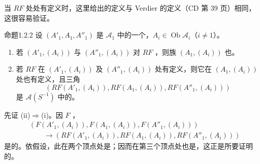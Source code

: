 当 $RF$ 处处有定义时，这里给出的定义与 Verdier 的定义（CD 第 39 页）相同，这很容易验证。

\begin{SGAresult}{命题}{1.2.2}
设 $(A'_1,A_1,A''_1)$ 是 $\mathcal A_1$ 中的一个，$A_i\in\operatorname{Ob}\mathcal A_i$（$i\ne1$）。
\begin{enumerate}
\item[(i)] 若 $(A'_1,(A_i))$ 与 $(A''_1,(A_i))$ 对 $RF$ ，则族 $(A_1,(A_i))$ 也。
\item[(ii)] 若 $RF$ 在 $(A'_1,(A_i))$ 及 $(A''_1,(A_i))$ 处有定义，则它在 $(A_1,(A_i))$ 处也有定义，且三角
\[
(RF(A'_1,(A_i)),RF(A_1,(A_i)),RF(A''_1,(A_i)))
\]
是 $\mathcal A(S^{-1})$ 中的。
\end{enumerate}
\end{SGAresult}
先证 (ii)$\Rightarrow$(i)。因 $F$ ，
\[
\begin{aligned}
{}&(F(A'_1,(A_i)),F(A_1,(A_i)),F(A''_1,(A_i)))\\
&\qquad\longrightarrow(RF(A'_1,(A_i)),RF(A_1,(A_i)),RF(A''_1,(A_i)))
\end{aligned}
\]
是的。依假设，此在两个顶点处是；因而在第三个顶点处也是，这正是所要证明的。


